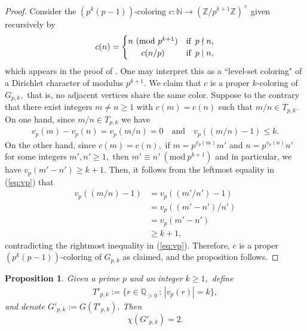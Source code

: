\documentclass[12pt, reqno, a4paper]{amsart}
\newtheorem{proposition}{Proposition}[section]
\theoremstyle{definition}
\theoremstyle{remark}
\numberwithin{equation}{section}
\newcommand{\Mod}[1]{\ (\mathrm{mod}\ #1)}
\newcommand{\N}{\mathbb{N}}
\renewcommand{\leq}{\leqslant}
\renewcommand{\geq}{\geqslant}
\begin{document}
\begin{proof}
Consider the $(p^{k}(p-1))$-coloring $c:\N\to (\mathbb{Z}/p^{k+1}\mathbb{Z})^{\times}$ given recursively by
  \[ c(n) = \begin{cases}
      n \Mod{p^{k+1}} &\text{if  $\,p \nmid n$},\\
  \hfil    c(n/p) &\text{if  $\,p \mid n$},
  \end{cases} \]
which appears in the proof of \cite[Proposition 3.3]{MR4594405}. One may interpret this as a ``level-set coloring" of a Dirichlet character of modulus $p^{k+1}.$ We claim that $c$ is a proper $k$-coloring of $G_{p,k},$ that is, no adjacent vertices share the same color. Suppose to the contrary that there exist integers $m \neq n \geq 1$ with $c(m)=c(n)$ such that 
$m/n \in T_{p,k}.$ On one hand, since $m/n \in T_{p,k}$ we have
\begin{align}
v_p(m)-v_p(n)=v_p(m/n)=0 \quad \text{and}  \quad v_p((m/n)-1) \leq k. \label{eq:vp} 
\end{align}
On the other hand, since $c(m)=c(n),$ if $m=p^{v_p(m)}m'$ and $n=p^{v_p(n)}n'$ for some integers $m',n' \geq 1,$ then $m' \equiv n' \Mod{p^{k+1}}$ and in particular, we have $v_p(m'-n') \geq k+1.$ Then, it follows from the leftmost equality in (\ref{eq:vp}) that
\begin{align*}
v_p \left( (m/n)-1\right) &= v_p((m'/n')-1) \\
&= v_p((m'-n')/n') \\
&= v_p(m'-n') \\
&\geq  k+1, 
\end{align*}
contradicting the rightmost inequality in (\ref{eq:vp}). Therefore, $c$ is a proper $(p^{k}(p-1))$-coloring of $G_{p,k}$ as claimed, and the proposition follows.  
\end{proof}

\begin{proposition} \label{prop:3}
Given a prime $p$ and an integer $k \geq 1,$ define
\begin{align*}
T'_{p,k}:=\{ r \in \mathbb{Q}_{>0} \,:\, |v_p(r)|=k \},
\end{align*}
and denote \( G'_{p,k} := G(T'_{p,k}) \). Then
\[
\chi(G'_{p,k}) = 2.
\]
\end{proposition}
\end{document}
